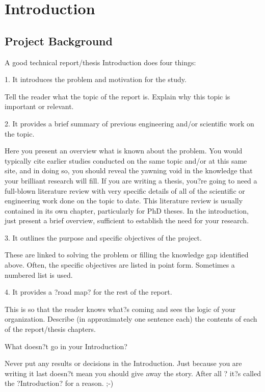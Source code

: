\documentclass[Report.tex]{subfiles}
\begin{document}
\chapter{Introduction}
\section{Project Background}

A good technical report/thesis Introduction does four things:

1.       It introduces the problem and motivation for the study.

    Tell the reader what the topic of the report is.
    Explain why this topic is important or relevant.

2.       It provides a brief summary of previous engineering and/or scientific work on the topic.

    Here you present an overview what is known about the problem.  You would typically cite earlier studies conducted on the same topic and/or at this same site, and in doing so, you should reveal the yawning void in the knowledge that your brilliant research will fill.
    If you are writing a thesis, you?re going to need a full-blown literature review with very specific details of all of the scientific or engineering work done on the topic to date.  This literature review is usually contained in its own chapter, particularly for PhD theses.  In the introduction, just present a brief overview, sufficient to establish the need for your research.

3.       It outlines the purpose and specific objectives of the project.

    These are linked to solving the problem or filling the knowledge gap identified above.
    Often, the specific objectives are listed in point form. Sometimes a numbered list is used.

4.       It provides a ?road map? for the rest of the report.

    This is so that the reader knows what?s coming and sees the logic of your organization.
    Describe (in approximately one sentence each) the contents of each of the report/thesis chapters.

What doesn?t go in your Introduction?

    Never put any results or decisions in the Introduction.  Just because you are writing it last doesn?t mean you should give away the story. After all ? it?s called the ?Introduction? for a reason. ;-)
\end{document}
